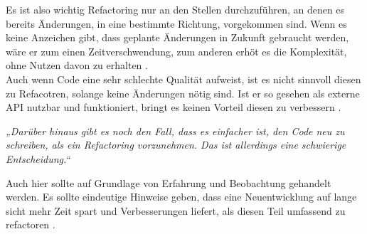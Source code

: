 \par
Es ist also wichtig Refactoring nur an den Stellen durchzuführen, an denen es bereits Änderungen, in eine bestimmte Richtung, vorgekommen sind.
Wenn es keine Anzeichen gibt, dass geplante Änderungen in Zukunft gebraucht werden, wäre er zum einen Zeitverschwendung, zum anderen erhöt es die Komplexität, ohne Nutzen davon zu erhalten \citep[S. 322]{fiveLines.2023}.\\
Auch wenn Code eine sehr schlechte Qualität aufweist, ist es nicht sinnvoll diesen zu Refacotren, solange keine Änderungen nötig sind. 
Ist er so gesehen als externe API nutzbar und funktioniert, bringt es keinen Vorteil diesen zu verbessern \citep[S. 89]{refactoring.2020}.\\
\begin{singlespace}
    \textit{„Darüber hinaus gibt es noch den Fall, dass es einfacher ist, den Code neu zu schreiben, als ein Refactoring vorzunehmen. Das ist allerdings eine schwierige Entscheidung.“}\citep[S. 90]{refactoring.2020}\\
\end{singlespace}
\par
Auch hier sollte auf Grundlage von Erfahrung und Beobachtung gehandelt werden.
Es sollte eindeutige Hinweise geben, dass eine Neuentwicklung auf lange sicht mehr Zeit spart und Verbesserungen liefert, als diesen Teil umfassend zu refactoren \citep[S. 90]{refactoring.2020}.
